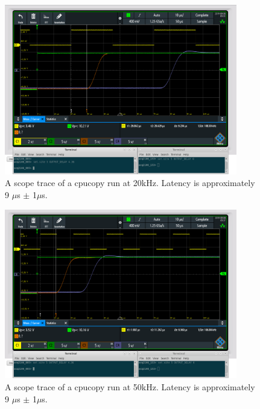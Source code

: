 \documentclass{article}
\begin{document}
\begin{figure}
	\centering
	\includegraphics[width=4.0in]{images/20kHz_annotated_scope_cpucopy_2.png}
	\caption{A scope trace of a cpucopy run at 20kHz. Latency is approximately 9 $\mu$s $\pm$ 1$\mu$s.}
	\label{cpu20scope}
\end{figure}

\begin{figure}
	\centering
	\includegraphics[width=4.0in]{images/50kHz_annotated_scope_cpucopy_2.png}
	\caption{A scope trace of a cpucopy run at 50kHz. Latency is approximately  9 $\mu$s $\pm$ 1$\mu$s.}
	\label{cpu50scope}
\end{figure}
\end{document}
